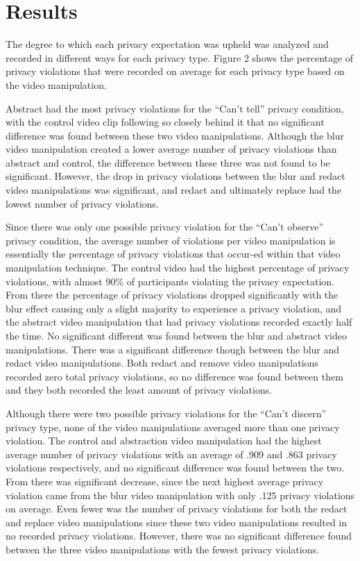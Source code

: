 \documentclass{acm_proc_article-sp}
\begin{document}
\section{Results}
The degree to which each privacy expectation was upheld was analyzed and recorded in different ways for each privacy type. Figure 2 shows the percentage of privacy violations that were recorded on average for each privacy type based on the video manipulation.

Abstract had the most privacy violations for the ``Can't tell'' privacy condition, with the control video clip following so closely behind it that no significant difference was found between these two video manipulations. Although the blur video manipulation created a lower average number of privacy violations than abstract and control, the difference between these three was not found to be significant. However, the drop in privacy violations between the blur and redact video manipulations was significant, and redact and ultimately replace had the lowest number of privacy violations.

Since there was only one possible privacy violation for the ``Can't observe'' privacy condition, the average number of violations per video manipulation is essentially the percentage of privacy violations that occur-ed within that video manipulation technique. The control video had the highest percentage of privacy violations, with almost 90\% of participants violating the privacy expectation.  From there the percentage of privacy violations dropped significantly with the blur effect causing only a slight majority to experience a privacy violation, and the abstract video manipulation that had privacy violations recorded exactly half the time. No significant different was found between the blur and abstract video manipulations.  There was a significant difference though between the blur and redact video manipulations. Both redact and remove video manipulations recorded zero total privacy violations, so no difference was found between them and they both recorded the least amount of privacy violations.

Although there were two possible privacy violations for the ``Can't discern'' privacy type, none of the video manipulations averaged more than one privacy violation. The control and abstraction video manipulation had the highest average number of privacy violations with an average of .909 and .863 privacy violations respectively, and no significant difference was found between the two. From there was significant decrease, since the next highest average privacy violation came from the blur video manipulation with only .125 privacy violations on average. Even fewer was the number of privacy violations for both the redact and replace video manipulations since these two video manipulations resulted in no recorded privacy violations. However, there was no significant difference found between the three video manipulations with the fewest privacy violations.
\end{document}
